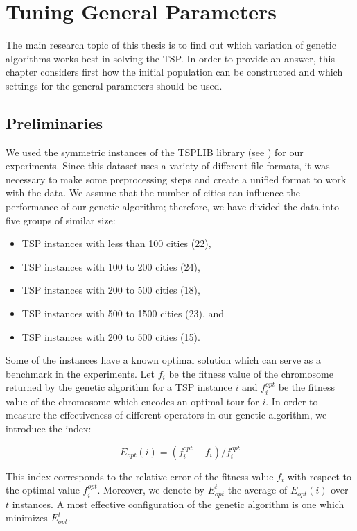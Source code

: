 \section{Tuning General Parameters}
\label{sec:prep}

The main research topic of this thesis is to find out which variation of genetic algorithms works best in solving the TSP. In order to provide an answer, this chapter considers first how the initial population can be constructed and which settings for the general parameters should be used. \par 

\subsection{Preliminaries}
\label{subsec:prep}

We used the symmetric instances of the TSPLIB library (see \cite{TSPLIB}) for our experiments. Since this dataset uses a variety of different file formats, it was necessary to make some preprocessing steps and create a unified format to work with the data. We assume that the number of cities can influence the performance of our genetic algorithm; therefore, we have divided the data into five groups of similar size:

\begin{itemize}
	\item TSP instances with less than 100 cities (22), 
	\item TSP instances with 100 to 200 cities (24),
	\item TSP instances with 200 to 500 cities (18),
	\item TSP instances with 500 to 1500 cities (23), and
	\item TSP instances with 200 to 500 cities (15).
\end{itemize}	

Some of the instances have a known optimal solution which can serve as a benchmark in the experiments. Let $f_{i}$ be the fitness value of the chromosome returned by the genetic algorithm for a TSP instance $i$ and $f_{i}^{opt}$ be the fitness value of the chromosome which encodes an optimal tour for $i$. In order to measure the effectiveness of different operators in our genetic algorithm, we introduce the index:

$$E_{opt}(i) = (f_{i}^{opt} - f_{i})/f_{i}^{opt}$$ 

This index corresponds to the relative error of the fitness value $f_{i}$ with respect to the optimal value $f_{i}^{opt}$. Moreover, we denote by $E_{opt}^{t}$ the average of $E_{opt}(i)$ over $t$ instances. A most effective configuration of the genetic algorithm is one which minimizes $E_{opt}^{t}$.\par 

